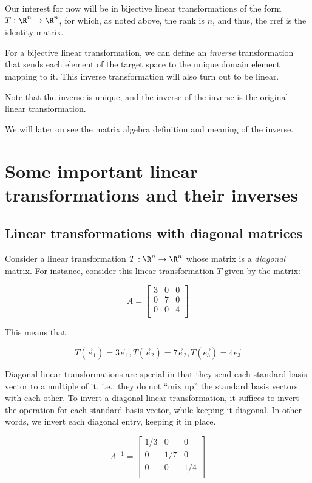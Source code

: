 \documentclass[10pt]{amsart}
\begin{document}
Our interest for now will be in bijective linear transformations of
the form $T: \R^n \to \R^n$, for which, as noted above, the rank is
$n$, and thus, the rref is the identity matrix.

For a bijective linear transformation, we can define an {\em inverse}
transformation that sends each element of the target space to the
unique domain element mapping to it. This inverse transformation will
also turn out to be linear.

Note that the inverse is unique, and the inverse of the inverse is the
original linear transformation.

We will later on see the matrix algebra definition and meaning of the
inverse.

\section{Some important linear transformations and their inverses}

\subsection{Linear transformations with diagonal matrices}

Consider a linear transformation $T:\R^n \to \R^n$ whose matrix is a
{\em diagonal} matrix. For instance, consider this linear
transformation $T$ given by the matrix:

$$A = \left[\begin{matrix} 3 & 0 & 0 \\ 0 & 7 & 0 \\ 0 & 0 & 4 \\\end{matrix}\right]$$

This means that:

$$T(\vec{e}_1) = 3\vec{e}_1, T(\vec{e}_2) = 7\vec{e}_2, T(\vec{e_3}) = 4\vec{e_3}$$

Diagonal linear transformations are special in that they send each
standard basis vector to a multiple of it, i.e., they do not ``mix
up'' the standard basis vectors with each other. To invert a diagonal
linear transformation, it suffices to invert the operation for each
standard basis vector, while keeping it diagonal. In other words, we
invert each diagonal entry, keeping it in place.

$$A^{-1} = \left[\begin{matrix} 1/3 & 0 & 0 \\ 0 & 1/7 & 0 \\ 0 & 0 & 1/4 \\\end{matrix}\right]$$
\end{document}

